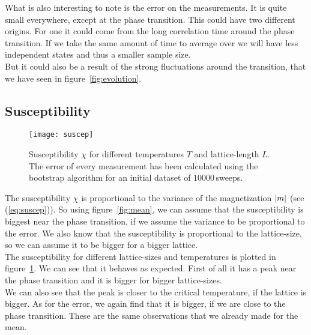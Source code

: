 What is also interesting to note is the error on the measurements. It is quite small everywhere, except at the phase transition. This could have two different origins. For one it could come from the long correlation time around the phase transition. If we take the same amount of time to average over we will have less independent states and thus a smaller sample size.\\
But it could also be a result of the strong fluctuations around the transition, that we have seen in figure~\ref{fig:evolution}.


\subsection{Susceptibility}

\begin{figure}
  \centering
  \texttt{[image: suscep]}
  \caption{Susceptibility $\chi$ for different temperatures $T$ and lattice-length $L$. The error of every measurement has been calculated using the bootstrap algorithm for an initial dataset of $10000\,$sweeps.}\label{fig:suscep}
\end{figure}

The susceptibility $\chi$ is proportional to the variance of the magnetization $\left\vert m \right\vert$ (see (\ref{eq:suscep})). So using figure~\ref{fig:mean}, we can assume that the susceptibility is biggest near the phase transition, if we assume the variance to be proportional to the error. We also know that the susceptibility is proportional to the lattice-size, so we can assume it to be bigger for a bigger lattice.\\
The susceptibility for different lattice-sizes and temperatures is plotted in figure~\ref{fig:suscep}. We can see that it behaves as expected. First of all it has a peak near the phase transition and it is bigger for bigger lattice-sizes.\\
We can also see that the peak is closer to the critical temperature, if the lattice is bigger. As for the error, we again find that it is bigger, if we are close to the phase transition. These are the same observations that we already made for the mean.


